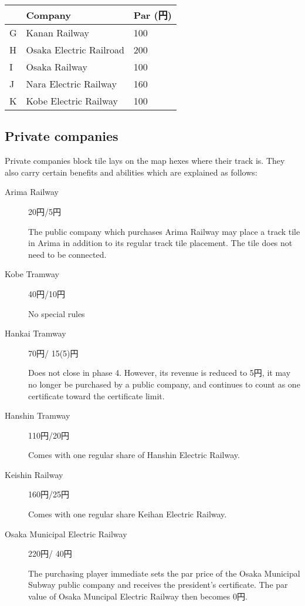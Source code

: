 \documentclass{article}
\begin{document}
\begin{CJK}{UTF8}{min}
\begin{multicols}{2}
\begin{description}
\begin{tabular}{lll}
 & Company & Par (円) \\
\hline
G & Kanan Railway & 100\\
H & Osaka Electric Railroad & 200\\
I & Osaka Railway & 100 \\
J & Nara Electric Railway & 160\\
K & Kobe Electric Railway & 100
\end{tabular}
\end{description}

\subsection{Private companies}
Private companies block tile lays on the map hexes where their track
is. They also carry certain benefits and abilities which are explained
as follows:

\begin{description}
\item[Arima Railway] \hfill 20円/5円

  The public company which purchases Arima Railway may place a track
  tile in Arima in addition to its regular track tile placement. The
  tile does not need to be connected.

\item[Kobe Tramway] \hfill 40円/10円

  No special rules

\item[Hankai Tramway] \hfill 70円/ 15(5)円

  Does not close in phase 4. However, its revenue is reduced to 5円, it may
  no longer be purchased by a public company, and continues to count
  as one certificate toward the certificate limit.

\item[Hanshin Tramway] \hfill 110円/20円

Comes with one regular share of Hanshin Electric Railway.

\item[Keishin Railway] \hfill 160円/25円

Comes with one regular share Keihan Electric Railway.

\item[Osaka Municipal Electric Railway] \hfill 220円/ 40円 \label{osaka-municipal}

  The purchasing player immediate sets the par price of the Osaka
  Municipal Subway public company and receives the president's
  certificate. The par value of Osaka Muncipal Electric Railway then
  becomes 0円.


\end{description}
\end{multicols}
\end{CJK}
\end{document}
